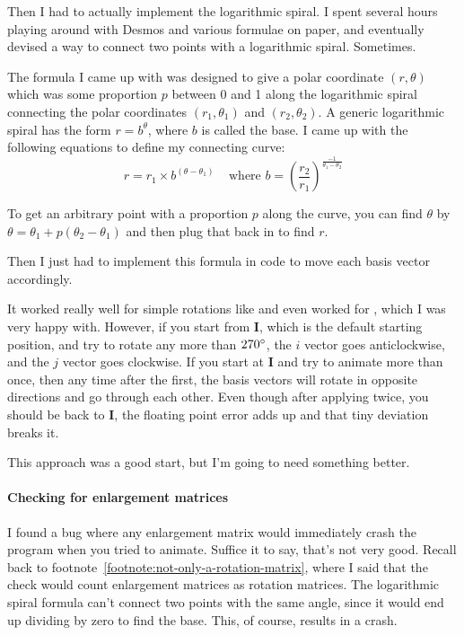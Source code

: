 \documentclass[../development.tex]{subfiles}
\begin{document}

Then I had to actually implement the logarithmic spiral. I spent several hours playing around with Desmos and various formulae on paper, and eventually devised a way to connect two points with a logarithmic spiral. Sometimes.

The formula I came up with was designed to give a polar coordinate $(r, \theta)$ which was some proportion $p$ between 0 and 1 along the logarithmic spiral connecting the polar coordinates $(r_1, \theta_1)$ and $(r_2, \theta_2)$. A generic logarithmic spiral has the form $r = b^\theta$, where $b$ is called the base. I came up with the following equations to define my connecting curve:
$$r = r_1 \times b^{(\theta - \theta_1)}\ \ \ \ \ \text{where } b = \left(\frac{r_2}{r_1}\right)^{\frac{-1}{\theta_1 - \theta_2}}$$

To get an arbitrary point with a proportion $p$ along the curve, you can find $\theta$ by $\theta = \theta_1 + p(\theta_2 - \theta_1)$ and then plug that back in to find $r$.

Then I just had to implement this formula in code to move each basis vector accordingly.


It worked really well for simple rotations like  and even worked for , which I was very happy with. However, if you start from $\mathbf{I}$, which is the default starting position, and try to rotate any more than $270\degree$, the $i$ vector goes anticlockwise, and the $j$ vector goes clockwise. If you start at $\mathbf{I}$ and try to animate  more than once, then any time after the first, the basis vectors will rotate in opposite directions and go through each other. Even though after applying  twice, you should be back to $\mathbf{I}$, the floating point error adds up and that tiny deviation breaks it.

This approach was a good start, but I'm going to need something better.

\paragraph{Checking for enlargement matrices\label{development:making-v0.2.2:animating-rotations:checking-for-enlargement-matrices}}

I found a bug where any enlargement matrix would immediately crash the program when you tried to animate. Suffice it to say, that's not very good. Recall back to footnote~\ref{footnote:not-only-a-rotation-matrix}, where I said that the check would count enlargement matrices as rotation matrices. The logarithmic spiral formula can't connect two points with the same angle, since it would end up dividing by zero to find the base. This, of course, results in a crash.
\end{document}
